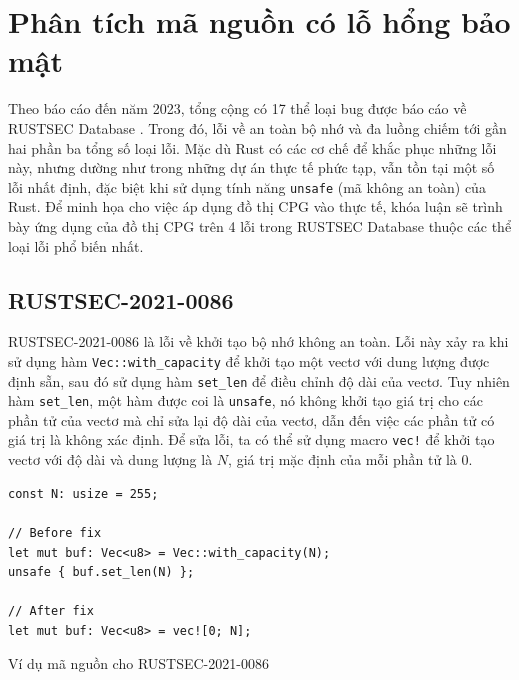 \section{Phân tích mã nguồn có lỗ hổng bảo mật}

Theo báo cáo đến năm 2023, tổng cộng có 17 thể loại bug được báo cáo về RUSTSEC Database \cite{zheng2023closer}.
Trong đó, lỗi về an toàn bộ nhớ và đa luồng chiếm tới gần hai phần ba tổng số loại lỗi.
Mặc dù Rust có các cơ chế để khắc phục những lỗi này, nhưng dường như trong những dự án thực tế phức tạp, vẫn tồn tại một số lỗi nhất định, đặc biệt khi sử dụng tính năng \texttt{unsafe} (mã không an toàn) của Rust.
Để minh họa cho việc áp dụng đồ thị CPG vào thực tế, khóa luận sẽ trình bày ứng dụng của đồ thị CPG trên 4 lỗi trong RUSTSEC Database thuộc các thể loại lỗi phổ biến nhất.

\subsection{RUSTSEC-2021-0086}

RUSTSEC-2021-0086 là lỗi về khởi tạo bộ nhớ không an toàn.
Lỗi này xảy ra khi sử dụng hàm \texttt{Vec::with\_capacity} để khởi tạo một vectơ với dung lượng được định sẵn, sau đó sử dụng hàm \texttt{set\_len} để điều chỉnh độ dài của vectơ.
Tuy nhiên hàm \texttt{set\_len}, một hàm được coi là \texttt{unsafe}, nó không khởi tạo giá trị cho các phần tử của vectơ mà chỉ sửa lại độ dài của vectơ, dẫn đến việc các phần tử có giá trị là không xác định.
Để sửa lỗi, ta có thể sử dụng macro \texttt{vec!} để khởi tạo vectơ với độ dài và dung lượng là $N$, giá trị mặc định của mỗi phần tử là $0$.

\begin{listing}[H]
\begin{verbatim}
const N: usize = 255;

// Before fix
let mut buf: Vec<u8> = Vec::with_capacity(N);
unsafe { buf.set_len(N) };

// After fix
let mut buf: Vec<u8> = vec![0; N];
\end{verbatim}
\caption{Ví dụ mã nguồn cho RUSTSEC-2021-0086}
\label{code:c4_RUSTSEC-2021-0086}
\end{listing}

